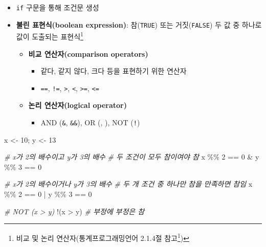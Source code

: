 \documentclass[
  11pt,
]{krantz}
\newenvironment{Shaded}{\begin{snugshade}}{\end{snugshade}}
\newcommand{\CommentTok}[1]{\textcolor[rgb]{0.37,0.37,0.37}{\textit{#1}}}
\newcommand{\DecValTok}[1]{\textcolor[rgb]{0.06,0.06,0.06}{#1}}
\newcommand{\NormalTok}[1]{#1}
\newcommand{\OtherTok}[1]{\textcolor[rgb]{0.37,0.37,0.37}{#1}}
\newcommand{\SpecialCharTok}[1]{\textcolor[rgb]{0,0,0}{#1}}
\providecommand{\tightlist}{%
  \setlength{\itemsep}{0pt}\setlength{\parskip}{0pt}}
\renewcommand{\href}[2]{#2\footnote{\url{#1}}}
\begin{document}
\begin{itemize}
\tightlist
\item
  \texttt{if} 구문을 통해 조건문 생성
\item
  \textbf{불린 표현식(boolean expression)}: 참(\texttt{TRUE}) 또는 거짓(\texttt{FALSE}) 두 값 중 하나로 값이 도출되는 표현식\footnote{비교 및 논리 연산자(\href{https://zorba78.github.io/cnu-r-programming-lecture-note/scalar.html\#character}{통계프로그래밍언어 2.1.4절 참고})}

  \begin{itemize}
  \tightlist
  \item
    \textbf{비교 연산자(comparison operators)}

    \begin{itemize}
    \tightlist
    \item
      같다, 같지 않다, 크다 등을 표현하기 위한 연산자
    \item
      \texttt{==}, \texttt{!=}, \texttt{\textgreater{}}, \texttt{\textless{}}, \texttt{\textgreater{}=}, \texttt{\textless{}=}
    \end{itemize}
  \item
    \textbf{논리 연산자(logical operator)}

    \begin{itemize}
    \tightlist
    \item
      AND (\texttt{\&}, \texttt{\&\&}), OR (\texttt{\textbar{}}, \texttt{\textbar{}\textbar{}}), NOT (\texttt{!})
    \end{itemize}
  \end{itemize}
\end{itemize}

\footnotesize

\begin{Shaded}
\begin{Highlighting}[]
\NormalTok{x }\OtherTok{\textless{}{-}} \DecValTok{10}\NormalTok{; y }\OtherTok{\textless{}{-}} \DecValTok{13}

\CommentTok{\# x가 2의 배수이고 y가 3의 배수}
\CommentTok{\# 두 조건이 모두 참이여야 참}
\NormalTok{x }\SpecialCharTok{\%\%} \DecValTok{2} \SpecialCharTok{==} \DecValTok{0} \SpecialCharTok{\&}\NormalTok{ y }\SpecialCharTok{\%\%} \DecValTok{3} \SpecialCharTok{==} \DecValTok{0} 

\CommentTok{\# x가 2의 배수이거나 y가 3의 배수 }
\CommentTok{\# 두 개 조건 중 하나만 참을 만족하면 참임}
\NormalTok{x }\SpecialCharTok{\%\%} \DecValTok{2} \SpecialCharTok{==} \DecValTok{0} \SpecialCharTok{|}\NormalTok{ y }\SpecialCharTok{\%\%} \DecValTok{3} \SpecialCharTok{==} \DecValTok{0} 

\CommentTok{\# NOT (x \textgreater{} y)}
\SpecialCharTok{!}\NormalTok{(x }\SpecialCharTok{\textgreater{}}\NormalTok{ y) }\CommentTok{\# 부정에 부정은 참}
\end{Highlighting}
\end{Shaded}
\end{document}
